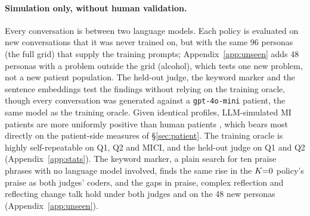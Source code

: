 \paragraph{Simulation only, without human validation.}
Every conversation is between two language models. Each policy is evaluated on new conversations
that it was never trained on, but with the same 96 personas (the full grid) that supply the
training prompts; Appendix~\ref{app:unseen} adds 48 personas with a problem outside the grid
(alcohol), which tests one new problem, not a new patient population.
The held-out judge, the keyword marker and the sentence embeddings test the findings without
relying on the training oracle, though every conversation was generated against a
\texttt{gpt-4o-mini} patient, the same model as the training oracle. Given identical profiles,
LLM-simulated MI patients are more uniformly positive than human patients
\citep{hoang2026standardised}, which bears most directly on the patient-side measures of
\S\ref{sec:patient}. %
The training oracle is highly self-repeatable on Q1, Q2 and MICI, and the held-out judge on Q1 and
Q2 (Appendix~\ref{app:stats}). The keyword marker, a plain search for ten praise phrases with no
language model involved, finds the same rise in the $K{=}0$ policy's praise as both judges' coders,
and the gaps in praise, complex reflection and reflecting change talk hold under both judges and on
the 48 new personas (Appendix~\ref{app:unseen}).


